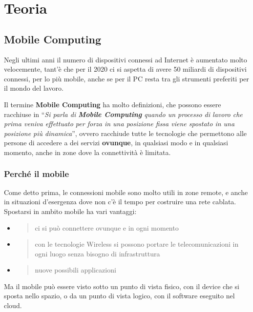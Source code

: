 \part{Teoria}

\chapter{Mobile Computing}
\label{mobile-computing}

Negli ultimi anni il numero di dispositivi connessi ad Internet è
aumentato molto velocemente, tant'è che per il 2020 ci si aspetta di
avere 50 miliardi di dispositivi connessi, per lo più mobile, anche se
per il PC resta tra gli strumenti preferiti per il mondo del lavoro.

Il termine \textbf{Mobile Computing} ha molto definizioni, che possono
essere racchiuse in ``\emph{Si parla di \textbf{Mobile Computing} quando
un processo di lavoro che prima veniva effettuato per forza in una
posizione fissa viene spostato in una posizione più dinamica}'', ovvero
racchiude tutte le tecnologie che permettono alle persone di accedere a
dei servizi \textbf{ovunque}, in qualsiasi modo e in qualsiasi momento, anche 
in zone dove la connettività è limitata.

\section{Perché il mobile}

Come detto prima, le connessioni mobile sono molto utili in zone remote, e 
anche in situazioni d'esergenza dove non c'è il tempo per costruire una rete 
cablata.
Spostarsi in ambito mobile ha vari vantaggi:

\begin{itemize}
\item
  \begin{quote}
  ci si può connettere ovunque e in ogni momento
  \end{quote}
\item
  \begin{quote}
  con le tecnologie Wireless si possono portare le telecomunicazioni in
  ogni luogo senza bisogno di infrastruttura
  \end{quote}
\item
  \begin{quote}
  nuove possibili applicazioni
  \end{quote}
\end{itemize}

Ma il mobile può essere visto sotto un punto di vista fisico, con il
device che si sposta nello spazio, o da un punto di vista logico, con il
software eseguito nel cloud.

